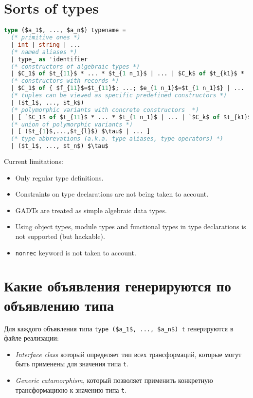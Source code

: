 \documentclass[acmsmall,review,anonymous]{acmart}\settopmatter{printfolios=true,printccs=false,printacmref=false}
\begin{document}
\section{Sorts of types}
% 

\begin{lstlisting}[language=ocaml]
type ($a_1$, ..., $a_n$) typename =
  (* primitive ones *)
  | int | string | ...
  (* named aliases *)
  | type_ as 'identifier
  (* constructors of algebraic types *)
  | $C_1$ of $t_{11}$ * ... * $t_{1 n_1}$ | ... | $C_k$ of $t_{k1}$ * ... * $t_{k n_k}$
  (* constructors with records *)
  | $C_1$ of { $f_{11}$=$t_{11}$; ...; $e_{1 n_1}$=$t_{1 n_1}$} | ... | $C_k$ of { $f_{k1}$=$t_{k1}$;  ...; $f_{k n_k}$=$t_{k n_k}$ }
  (* tuples can be viewed as specific predefined constructors *)
  | ($t_1$, ..., $t_k$)
  (* polymorphic variants with concrete constructors  *)
  | [ `$C_1$ of $t_{11}$ * ... * $t_{1 n_1}$ | ... | `$C_k$ of $t_{k1}$ * ... * $t_{k n_k}$ ] 
  (* union of polymorphic variants *)
  | [ ($t_{1}$,...,$t_{l}$) $\tau$ | ... ]
  (* type abbrevations (a.k.a. type aliases, type operators) *)
  | ($t_1$, ..., $t_n$) $\tau$
\end{lstlisting}
Current limitations:
\begin{itemize}
 \item Only regular type definitions.
 \item Constraints on type declarations are not being taken to account.
 \item GADTs are treated as simple algebraic data types.
 \item Using object types, module types and functional types in type declarations is not supported (but hackable).
 \item \verb=nonrec= keyword is not taken to account.
\end{itemize}


\section{Какие объявления генерируются по объявлению типа}

Для каждого объявления типа \lstinline{type ($a_1$, ..., $a_n$) t} генерируются в файле реализации:
\begin{itemize}
 \item \textit{Interface class} который определяет тип всех трансформаций, которые могут быть применены для значения типа \lstinline{t}.
 \item \textit{Generic catamorphism}, который позволяет применить конкретную трансформациюю к значению типа \lstinline{t}.
\end{itemize}
\end{document}
